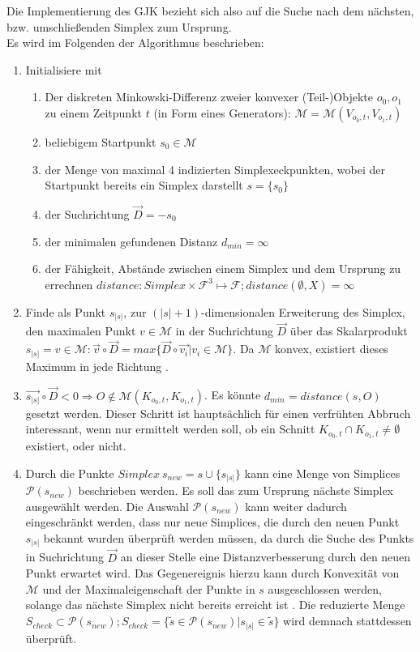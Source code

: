 Die Implementierung des GJK bezieht sich also auf die Suche nach dem nächsten, bzw. umschließenden Simplex zum Ursprung.\\
Es wird im Folgenden der Algorithmus beschrieben:
\begin{enumerate}
	\item Initialisiere mit
	\begin{enumerate}
		\item Der diskreten Minkowski-Differenz zweier konvexer (Teil-)Objekte $o_0, o_1$ zu einem Zeitpunkt $t$ (in Form eines Generators): $\mathcal{M} = \mathcal{M}(V_{o_0, t}, V_{o_1, t})$
		\item beliebigem Startpunkt $s_0 \in \mathcal{M}$
		\item der Menge von maximal 4 indizierten Simplexeckpunkten, wobei der Startpunkt bereits ein Simplex darstellt $s = \{s_0\}$
		\item der Suchrichtung $\vec{D} = -s_0$
		\item der minimalen gefundenen Distanz $d_{min} = \infty$
		\item der Fähigkeit, Abstände zwischen einem Simplex und dem Ursprung zu errechnen $distance: Simplex \times \mathcal{F}^3 \mapsto \mathcal{F} ; distance(\emptyset, X) = \infty$
	\end{enumerate}	
	\item Finde als Punkt $s_{|s|}$, zur $(|s|+1)$-dimensionalen Erweiterung des Simplex, den maximalen Punkt $v \in \mathcal{M}$ in der Suchrichtung $\vec{D}$ über das Skalarprodukt $s_{|s|} = v \in \mathcal{M} : \vec{v} \circ \vec{D} = max\{\vec{D} \circ \vec{v_i}| v_i \in  \mathcal{M}\}$. Da $\mathcal{M}$ konvex, existiert dieses Maximum in jede Richtung \cite[p. 195]{gjk}.
	\item $\vec{s_{|s|}} \circ \vec{D} < 0 \Rightarrow O \notin \mathcal{M}(K_{o_0, t}, K_{o_1, t})$. Es könnte $d_{min} = distance(s, O)$ gesetzt werden. Dieser Schritt ist hauptsächlich für einen verfrühten Abbruch interessant, wenn nur ermittelt werden soll, ob ein Schnitt $K_{o_0, t} \cap K_{o_1, t} \neq \emptyset$ existiert, oder nicht.
	\item Durch die Punkte $Simplex~s_{new} = s \cup \{s_{|s|}\}$ kann eine Menge von Simplices $\mathcal{P}(s_{new})$ beschrieben werden. Es soll das zum Ursprung nächste Simplex ausgewählt werden. Die Auswahl $\mathcal{P}(s_{new})$ kann weiter dadurch eingeschränkt werden, dass nur neue Simplices, die durch den neuen Punkt $s_{|s|}$ bekannt wurden überprüft werden müssen, da durch die Suche des Punkts in Suchrichtung $\vec{D}$ an dieser Stelle eine Distanzverbesserung durch den neuen Punkt erwartet wird. Das Gegenereignis hierzu kann durch Konvexität von $\mathcal{M}$ und der Maximaleigenschaft der Punkte in $s$ ausgeschlossen werden, solange das nächste Simplex nicht bereits erreicht ist \cite{gjk-casey}.  Die reduzierte Menge $S_{check} \subset \mathcal{P}(s_{new}); S_{check} = \{ \tilde{s} \in \mathcal{P}(s_{new}) | s_{|s|} \in \tilde{s} \}$ wird demnach stattdessen überprüft.

\end{enumerate}
